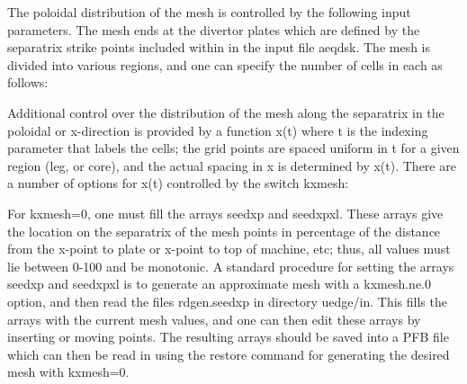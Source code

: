 \documentclass [12pt]{article}
\def\hsa{\hskip.4truein}
\begin{document}
The poloidal distribution of the mesh is controlled by the following input
parameters.  The mesh ends at the divertor plates which are defined by the
separatrix strike points included within in the input file {\sf aeqdsk}.  The
mesh is divided into various regions, and one can specify the number of cells
in each as follows: 
{\sf
{}
}
Additional control over the distribution of the mesh along the
separatrix in the poloidal or x-direction is provided by a function
x(t) where t is the indexing parameter that labels the cells; the grid
points are spaced uniform in t for a given region (leg, or core), and
the actual spacing in x is determined by x(t). There are a number of
options for x(t) controlled by the switch kxmesh:
{\sf
{}
}

For kxmesh=0, one must fill the arrays seedxp and seedxpxl. These arrays give
the location on the separatrix of the mesh points in percentage of the
distance from the x-point to plate or x-point to top of machine, etc; thus,
all values must lie between 0-100 and be monotonic.  A standard procedure for
setting the arrays seedxp and seedxpxl is to generate an approximate mesh
with a kxmesh.ne.0 option, and then read the files rdgen.seedxp in directory
uedge/in.  This fills the arrays with the current mesh values, and one can
then edit these arrays by inserting or moving points.  The resulting arrays
should be saved into a PFB file which can then be read in using the restore
command for generating the desired mesh with kxmesh=0.
\end{document}

